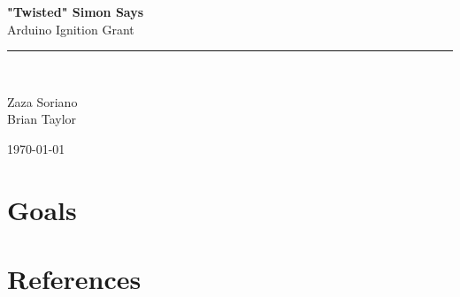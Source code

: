 \documentclass[12pt,letterpaper,oneside]{article}
\newcommand{\HRule}{\rule{\linewidth}{0.5mm}}
\begin{document}
\begin{titlepage}
\vspace*{\fill}
\begin{center}
	
{\huge \bfseries "Twisted" Simon Says} \\[0.4cm]
Arduino Ignition Grant
\HRule \\[0.4cm]

\begin{minipage}{\textwidth}
\center
Zaza Soriano\\
Brian Taylor
\end{minipage}

\vspace*{\fill}

{\large \today}
\end{center}
\end{titlepage}

\doublespace
\tableofcontents %
\newpage
\listoftables %
\newpage
\lstlistoflistings %
\newpage
\singlespace
{} %
			
\section{Goals}

\section{References}
\end{document}
